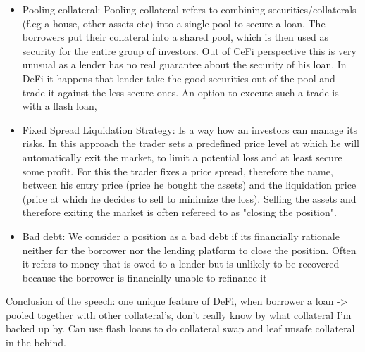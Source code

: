 \documentclass{article}
\begin{document}
\begin{itemize}
\item {Pooling collateral}: 
Pooling collateral refers to  combining securities/collaterals (f.eg a house, other assets etc) into a single pool to secure a loan. The borrowers put their collateral into a shared pool, which is then used as security for the entire group of investors. Out of CeFi perspective this is very unusual as a lender has no real guarantee about the security of his loan. In DeFi it happens that lender take the good securities out of the pool and trade it against the less secure ones. An option to execute such a trade is with a flash loan, %

\item {Fixed Spread Liquidation Strategy}:
Is a way how an  investors can manage its risks. In this approach the trader sets a predefined price level at which he will automatically exit the market, to limit a potential loss and at least secure some profit. For this the trader fixes a price spread, therefore the name, between his entry price (price he bought the assets) and the liquidation price (price at which he decides to sell to minimize the loss). Selling the assets and therefore exiting the market is often refereed to as "closing the position".

\item {Bad debt}: We consider a position as a bad debt if its financially rationale neither for the borrower nor the lending platform to close the position. Often it refers to money that is owed to a lender but is unlikely to be recovered because the borrower is financially unable to refinance it
\end{itemize}

Conclusion of the speech: %
one unique feature of DeFi, when borrower a loan -> pooled together with other collateral's, don't really know by what collateral I'm backed up by. Can use flash loans to do collateral swap and leaf unsafe collateral in the behind.
\end{document}
